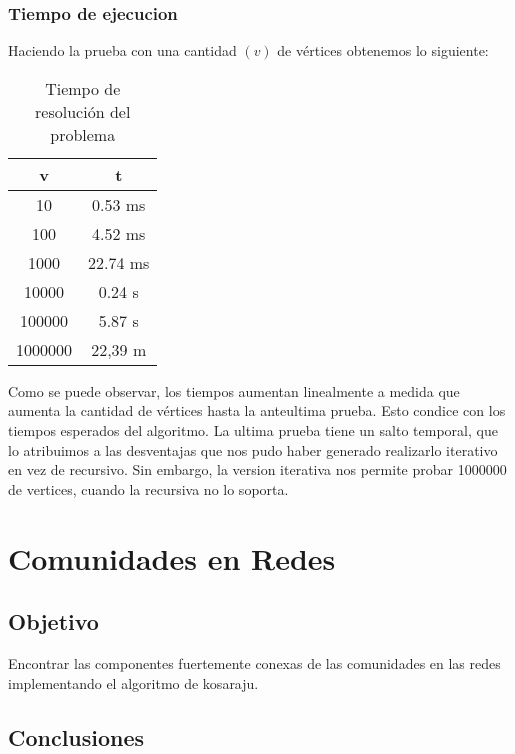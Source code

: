 \documentclass{article}
\begin{document}
            \subsubsection{Tiempo de ejecucion}
                Haciendo la prueba con una cantidad $(v)$ de vértices obtenemos lo siguiente:
                \begin{table}[h]
                    \centering
                    \caption{Tiempo de resolución del problema}
                    \begin{tabular}{c|c}
                        v & t \\
                        \hline
                        10 & 0.53 ms \\
                        \hline
                        100 & 4.52 ms \\
                        \hline
                        1000 & 22.74 ms \\
                        \hline
                        10000 & 0.24 s \\
                        \hline
                        100000 & 5.87 s \\
                        \hline
                        1000000 & 22,39 m
                    \end{tabular}
                \end{table}

                Como se puede observar, los tiempos aumentan linealmente a medida
                que aumenta la cantidad de vértices hasta la anteultima prueba.
                Esto condice con los tiempos esperados del algoritmo. La ultima prueba
                tiene un salto temporal, que lo atribuimos a las desventajas que nos
                pudo haber generado realizarlo iterativo en vez de recursivo. Sin
                embargo, la version iterativa nos permite probar 1000000 de vertices,
                cuando la recursiva no lo soporta.


    \section{Comunidades en Redes}
        \subsection{Objetivo}
          Encontrar las componentes fuertemente conexas de las comunidades en las
          redes implementando el algoritmo de kosaraju.
        \subsection{Conclusiones}
\end{document}
